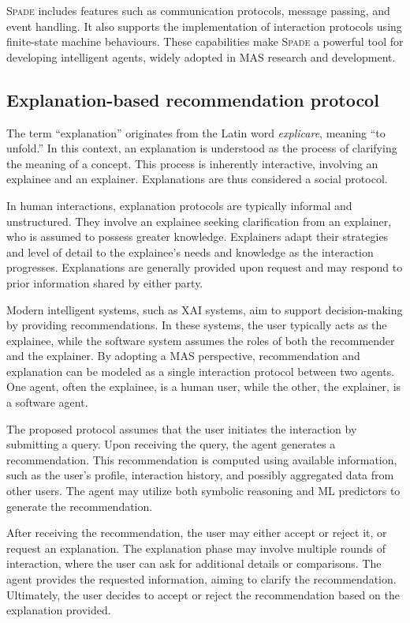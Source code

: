 \textsc{Spade} includes features such as communication protocols, message passing, and event handling.
%
It also supports the implementation of interaction protocols using finite-state machine behaviours.
%
These capabilities make \textsc{Spade} a powerful tool for developing intelligent agents, widely adopted in \gls{MAS} research and development.


\subsection{Explanation-based recommendation protocol}
\label{subsec:explanation-based-recommendation-protocol}
%
The term ``explanation'' originates from the Latin word \emph{explicare}, meaning ``to unfold.''
%
In this context, an explanation is understood as the process of clarifying the meaning of a concept.
%
This process is inherently interactive, involving an explainee and an explainer.
%
Explanations are thus considered a social protocol.

In human interactions, explanation protocols are typically informal and unstructured.
%
They involve an explainee seeking clarification from an explainer, who is assumed to possess greater knowledge.
%
Explainers adapt their strategies and level of detail to the explainee's needs and knowledge as the interaction progresses.
%
Explanations are generally provided upon request and may respond to prior information shared by either party.

Modern intelligent systems, such as \gls{XAI} systems, aim to support decision-making by providing recommendations.
%
In these systems, the user typically acts as the explainee, while the software system assumes the roles of both the recommender and the explainer.
%
By adopting a \gls{MAS} perspective, recommendation and explanation can be modeled as a single interaction protocol between two agents.
%
One agent, often the explainee, is a human user, while the other, the explainer, is a software agent.

The proposed protocol assumes that the user initiates the interaction by submitting a query.
%
Upon receiving the query, the agent generates a recommendation.
%
This recommendation is computed using available information, such as the user’s profile, interaction history, and possibly aggregated data from other users.
%
The agent may utilize both symbolic reasoning and \gls{ML} predictors to generate the recommendation.

%
After receiving the recommendation, the user may either accept or reject it, or request an explanation.
%
The explanation phase may involve multiple rounds of interaction, where the user can ask for additional details or comparisons.
%
The agent provides the requested information, aiming to clarify the recommendation.
%
Ultimately, the user decides to accept or reject the recommendation based on the explanation provided.

